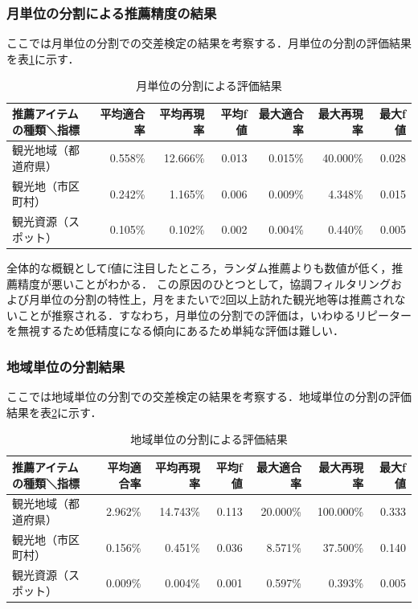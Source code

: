 \documentclass{jsarticle}
\begin{document}
\subsubsection{月単位の分割による推薦精度の結果}

ここでは月単位の分割での交差検定の結果を考察する．月単位の分割の評価結果を表\ref{result_monthly}に示す．

\begin{table}[!h]
\small
\caption{月単位の分割による評価結果}
\begin{center}
\begin{tabular}{lrrrrrr}
\label{result_monthly}
推薦アイテムの種類＼指標            & 平均適合率 & 平均再現率 & 平均f値 & 最大適合率 & 最大再現率 & 最大f値 \\ \hline
観光地域（都道府県）    & 0.558\% & 12.666\% & 0.013 & 0.015\% & 40.000\% & 0.028 \\
観光地（市区町村）      & 0.242\% &  1.165\% & 0.006 & 0.009\% &  4.348\% & 0.015 \\
観光資源（スポット）    & 0.105\% &  0.102\% & 0.002 & 0.004\% &  0.440\% & 0.005 \\
\end{tabular}
\end{center}
\end{table}

全体的な概観としてf値に注目したところ，ランダム推薦よりも数値が低く，推薦精度が悪いことがわかる．
この原因のひとつとして，協調フィルタリングおよび月単位の分割の特性上，月をまたいで2回以上訪れた観光地等は推薦されないことが推察される．すなわち，月単位の分割での評価は，いわゆるリピーターを無視するため低精度になる傾向にあるため単純な評価は難しい．

\subsubsection{地域単位の分割結果}

ここでは地域単位の分割での交差検定の結果を考察する．地域単位の分割の評価結果を表\ref{result_area}に示す．

\begin{table}[!h]
\small
\caption{地域単位の分割による評価結果}
\begin{center}
\begin{tabular}{lrrrrrr}
\label{result_area}
推薦アイテムの種類＼指標            & 平均適合率 & 平均再現率 & 平均f値 & 最大適合率 & 最大再現率 & 最大f値 \\ \hline
観光地域（都道府県）    & 2.962\% & 14.743\% & 0.113 & 20.000\% & 100.000\% & 0.333 \\
観光地（市区町村）      & 0.156\% &  0.451\% & 0.036 &  8.571\% &  37.500\% & 0.140 \\
観光資源（スポット）    & 0.009\% &  0.004\% & 0.001 &  0.597\% &   0.393\% & 0.005 \\
\end{tabular}
\end{center}
\end{table}
\end{document}
